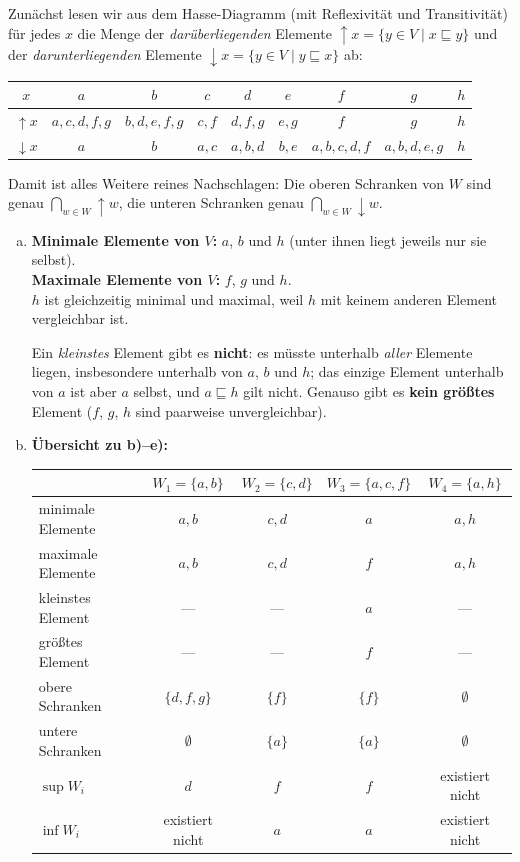 \begin{loesung}
Zunächst lesen wir aus dem Hasse-Diagramm (mit Reflexivität und Transitivität) für jedes $x$ die Menge der \emph{darüberliegenden} Elemente $\uparrow\! x=\{y\in V\mid x\sqsubseteq y\}$ und der \emph{darunterliegenden} Elemente $\downarrow\! x=\{y\in V\mid y\sqsubseteq x\}$ ab:

\begin{center}\small
\begin{tabular}{c|c|c|c|c|c|c|c|c}
$x$ & $a$ & $b$ & $c$ & $d$ & $e$ & $f$ & $g$ & $h$\\\hline
$\uparrow\! x$ & $a,c,d,f,g$ & $b,d,e,f,g$ & $c,f$ & $d,f,g$ & $e,g$ & $f$ & $g$ & $h$\\\hline
$\downarrow\! x$ & $a$ & $b$ & $a,c$ & $a,b,d$ & $b,e$ & $a,b,c,d,f$ & $a,b,d,e,g$ & $h$
\end{tabular}
\end{center}

Damit ist alles Weitere reines Nachschlagen: Die oberen Schranken von $W$ sind genau $\bigcap_{w\in W}\uparrow\! w$, die unteren Schranken genau $\bigcap_{w\in W}\downarrow\! w$.

\begin{enumerate}[a)]
  \item \textbf{Minimale Elemente von $V$:} $a$, $b$ und $h$ (unter ihnen liegt jeweils nur sie selbst).\\
  \textbf{Maximale Elemente von $V$:} $f$, $g$ und $h$.\\
  $h$ ist gleichzeitig minimal und maximal, weil $h$ mit keinem anderen Element vergleichbar ist.

  Ein \emph{kleinstes} Element gibt es \textbf{nicht}: es müsste unterhalb \emph{aller} Elemente liegen, insbesondere unterhalb von $a$, $b$ und $h$; das einzige Element unterhalb von $a$ ist aber $a$ selbst, und $a\sqsubseteq h$ gilt nicht. Genauso gibt es \textbf{kein größtes} Element ($f$, $g$, $h$ sind paarweise unvergleichbar).

  \item[] \textbf{Übersicht zu b)--e):}
  \begin{center}\small
  \begin{tabular}{l|c|c|c|c}
   & $W_1=\{a,b\}$ & $W_2=\{c,d\}$ & $W_3=\{a,c,f\}$ & $W_4=\{a,h\}$\\\hline
  minimale Elemente & $a,b$ & $c,d$ & $a$ & $a,h$\\
  maximale Elemente & $a,b$ & $c,d$ & $f$ & $a,h$\\
  kleinstes Element & --- & --- & $a$ & ---\\
  größtes Element & --- & --- & $f$ & ---\\
  obere Schranken & $\{d,f,g\}$ & $\{f\}$ & $\{f\}$ & $\emptyset$\\
  untere Schranken & $\emptyset$ & $\{a\}$ & $\{a\}$ & $\emptyset$\\
  $\sup W_i$ & $d$ & $f$ & $f$ & existiert nicht\\
  $\inf W_i$ & existiert nicht & $a$ & $a$ & existiert nicht
  \end{tabular}
  \end{center}


\end{enumerate}
\end{loesung}
